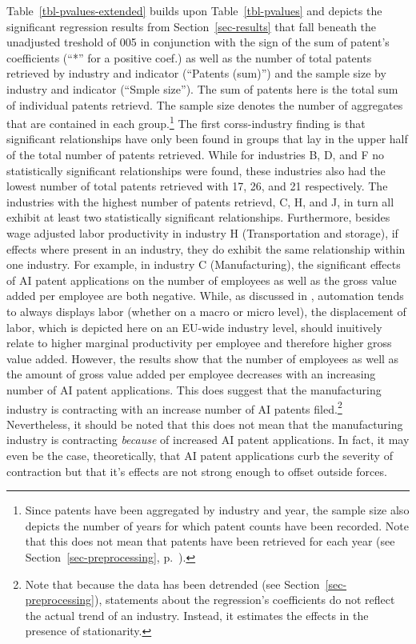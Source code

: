 \documentclass[
  11,
  a4paperpaper,
]{article}
\begin{document}
Table~\ref{tbl-pvalues-extended} builds upon Table~\ref{tbl-pvalues} and
depicts the significant regression results from
Section~\ref{sec-results} that fall beneath the unadjusted
\alpha treshold of 005 in conjunction with the sign of the sum of
patent's coefficients (``*'' for a positive coef.) as well as the number
of total patents retrieved by industry and indicator (``Patents (sum)'')
and the sample size by industry and indicator (``Smple size''). The sum
of patents here is the total sum of individual patents retrievd. The
sample size denotes the number of aggregates that are contained in each
group.\footnote{Since patents have been aggregated by industry and year,
  the sample size also depicts the number of years for which patent
  counts have been recorded. Note that this does not mean that patents
  have been retrieved for each year (see
  Section~\ref{sec-preprocessing},
  p.~\pageref{cleaning-missing-values}).} The first corss-industry
finding is that significant relationships have only been found in groups
that lay in the upper half of the total number of patents retrieved.
While for industries B, D, and F no statistically significant
relationships were found, these industries also had the lowest number of
total patents retrieved with 17, 26, and 21 respectively. The industries
with the highest number of patents retrievd, C, H, and J, in turn all
exhibit at least two statistically significant relationships.
Furthermore, besides wage adjusted labor productivity in industry H
(Transportation and storage), if effects where present in an industry,
they do exhibit the same relationship within one industry. For example,
in industry C (Manufacturing), the significant effects of AI patent
applications on the number of employees as well as the gross value added
per employee are both negative. While, as discussed in
, automation tends to always displays labor
(whether on a macro or micro level), the displacement of labor, which is
depicted here on an EU-wide industry level, should inuitively relate to
higher marginal productivity per employee and therefore higher gross
value added. However, the results show that the number of employees as
well as the amount of gross value added per employee decreases with an
increasing number of AI patent applications. This does suggest that the
manufacturing industry is contracting with an increase number of AI
patents filed.\footnote{Note that because the data has been detrended
  (see Section~\ref{sec-preprocessing}), statements about the
  regression's coefficients do not reflect the actual trend of an
  industry. Instead, it estimates the effects in the presence of
  stationarity.} Nevertheless, it should be noted that this does not
mean that the manufacturing industry is contracting \emph{because} of
increased AI patent applications. In fact, it may even be the case,
theoretically, that AI patent applications curb the severity of
contraction but that it's effects are not strong enough to offset
outside forces.
\end{document}
